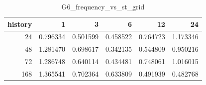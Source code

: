 \begin{table}
\caption{G6_frequency_vs_st_grid}
\label{tab:G6_frequency_vs_st_grid}
\begin{tabular}{rrrrrr}
\toprule
history & 1 & 3 & 6 & 12 & 24 \\
\midrule
24 & 0.796334 & 0.501599 & 0.458522 & 0.764723 & 1.173346 \\
48 & 1.281470 & 0.698617 & 0.342135 & 0.544809 & 0.950216 \\
72 & 1.286748 & 0.640114 & 0.434481 & 0.748061 & 1.016015 \\
168 & 1.365541 & 0.702364 & 0.633809 & 0.491939 & 0.482768 \\
\bottomrule
\end{tabular}
\end{table}
